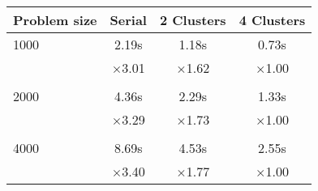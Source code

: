 \centering\begin{tabular}{l*{3}{c}}
\toprule
Problem size & Serial & 2 Clusters & 4 Clusters\\\midrule
1000 &   2.19s &   1.18s &   0.73s \\    
 &  $\times$3.01 &  $\times$1.62 &  $\times$1.00 \\ \\
2000 &   4.36s &   2.29s &   1.33s \\    
 &  $\times$3.29 &  $\times$1.73 &  $\times$1.00 \\ \\
4000 &   8.69s &   4.53s &   2.55s \\    
 &  $\times$3.40 &  $\times$1.77 &  $\times$1.00 \\
\bottomrule
\end{tabular}

